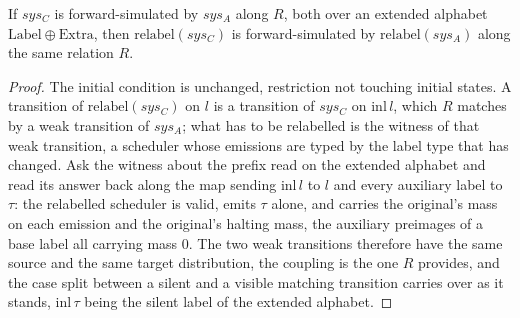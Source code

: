 \begin{theorem}
  \label{thm:precong-relabel}
  \leanok
  If $sys_C$ is forward-simulated by $sys_A$ along $R$, both over an extended alphabet $\mathrm{Label} \oplus \mathrm{Extra}$, then $\mathrm{relabel}(sys_C)$ is forward-simulated by $\mathrm{relabel}(sys_A)$ along the same relation $R$.
\end{theorem}

\begin{proof}\leanok
  The initial condition is unchanged, restriction not touching initial states.
  A transition of $\mathrm{relabel}(sys_C)$ on $l$ is a transition of $sys_C$ on $\mathrm{inl}\,l$, which $R$ matches by a weak transition of $sys_A$; what has to be relabelled is the witness of that weak transition, a scheduler whose emissions are typed by the label type that has changed.
  Ask the witness about the prefix read on the extended alphabet and read its answer back along the map sending $\mathrm{inl}\,l$ to $l$ and every auxiliary label to $\tau$: the relabelled scheduler is valid, emits $\tau$ alone, and carries the original's mass on each emission and the original's halting mass, the auxiliary preimages of a base label all carrying mass $0$.
  The two weak transitions therefore have the same source and the same target distribution, the coupling is the one $R$ provides, and the case split between a silent and a visible matching transition carries over as it stands, $\mathrm{inl}\,\tau$ being the silent label of the extended alphabet.
\end{proof}
